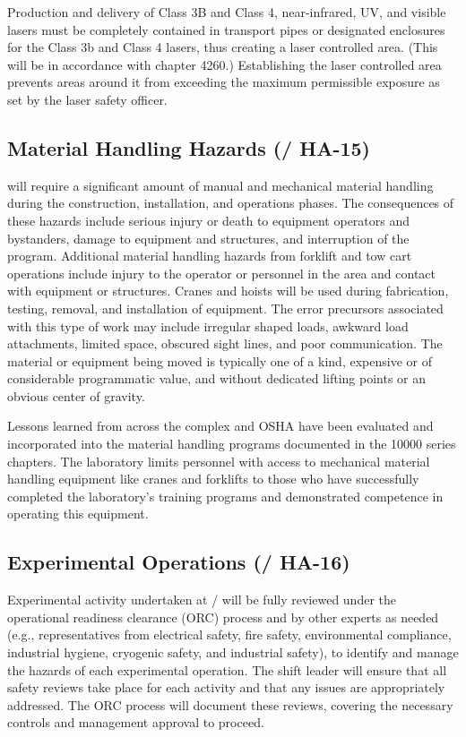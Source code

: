 Production and delivery of Class 3B and Class 4, near-infrared, UV,
and visible lasers must be completely contained in transport pipes or
designated enclosures for the Class 3b and Class 4 lasers, thus
creating a laser controlled area. (This will be in accordance with
\fnal {} chapter 4260.)  Establishing the laser controlled
area prevents areas around it from exceeding the maximum permissible
exposure as set by the \fnal laser safety officer.

\subsection{Material Handling Hazards (/ HA-15)}

 will require a significant amount of manual and mechanical
material handling during the construction, installation, and operations
phases.  The consequences of these hazards include serious injury or
death to equipment operators and bystanders, damage to equipment and
structures, and interruption of the program.  Additional material
handling hazards from forklift and tow cart operations include injury
to the operator or personnel in the area and contact with equipment or
structures. Cranes and hoists will be used during fabrication,
testing, removal, and installation of equipment. The error precursors
associated with this type of work may include irregular shaped loads,
awkward load attachments, limited space, obscured sight lines, and
poor communication.  The material or equipment being moved is
typically one of a kind, expensive or of considerable programmatic
value, and without dedicated lifting points or an obvious center
of gravity.

Lessons learned from across the  complex and OSHA have been
evaluated and incorporated into the \fnal material handling programs
documented in the  10000 series chapters.  The laboratory
limits personnel with access to mechanical material handling equipment
like cranes and forklifts to those who have successfully completed the
laboratory's training programs and demonstrated competence in
operating this equipment.


\subsection{Experimental Operations (/ HA-16)}

Experimental activity undertaken at / will be
fully reviewed under the operational readiness clearance (ORC) process
and by other experts as needed (e.g., representatives from electrical
safety, fire safety, environmental compliance, industrial hygiene,
cryogenic safety, and industrial safety), to identify and manage the
hazards of each experimental operation. The shift leader will ensure
that all safety reviews take place for each activity and that any
issues are appropriately addressed. The ORC process will document
these reviews, covering the necessary controls and management approval
to proceed.

